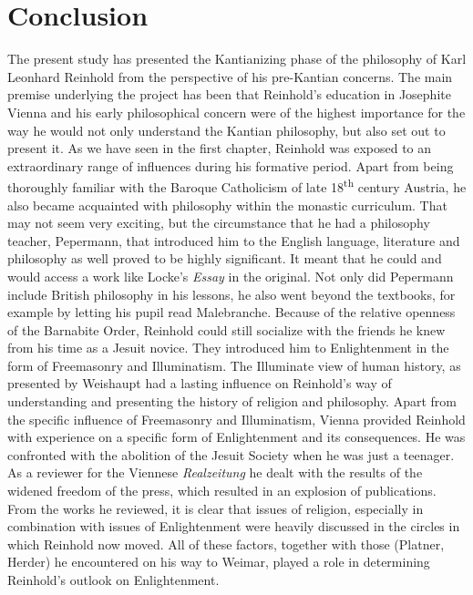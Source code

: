 
\chapter{Conclusion}


The present study has presented the Kantianizing phase of the philosophy of Karl Leonhard Reinhold from the perspective of his pre{-}Kantian concerns. The main premise underlying the project has been that Reinhold's education in Josephite Vienna and his early philosophical concern were of the highest importance for the way he would not only understand the Kantian philosophy, but also set out to present it. As we have seen in the first chapter, Reinhold was exposed to an extraordinary range of influences during his formative period. Apart from being thoroughly familiar with the Baroque Catholicism of late 18\textsuperscript{th} century Austria, he also became acquainted with philosophy within the monastic curriculum. That may not seem very exciting, but the circumstance that he had a philosophy teacher, Pepermann, that introduced him to the English language, literature and philosophy as well proved to be highly significant. It meant that he could and would access a work like Locke's \textit{Essay} in the original. Not only did Pepermann include British philosophy in his lessons, he also went beyond the textbooks, for example by letting his pupil read Malebranche. Because of the relative openness of the Barnabite Order, Reinhold could still socialize with the friends he knew from his time as a Jesuit novice. They introduced him to Enlightenment in the form of Freemasonry and Illuminatism. The Illuminate view of human history, as presented by Weishaupt had a lasting influence on Reinhold's way of understanding and presenting the history of religion and philosophy. Apart from the specific influence of Freemasonry and Illuminatism, Vienna provided Reinhold with experience on a specific form of Enlightenment and its consequences. He was confronted with the abolition of the Jesuit Society when he was just a teenager. As a reviewer for the Viennese \textit{Realzeitung} he dealt with the results of the widened freedom of the press, which resulted in an explosion of publications. From the works he reviewed, it is clear that issues of religion, especially in combination with issues of Enlightenment were heavily discussed in the circles in which Reinhold now moved. All of these factors, together with those (Platner, Herder) he encountered on his way to Weimar, played a role in determining Reinhold's outlook on Enlightenment. 

